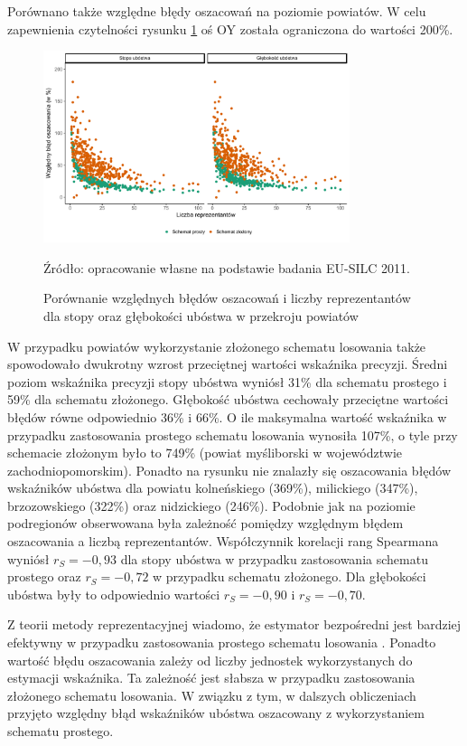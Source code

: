 Porównano także względne błędy oszacowań na poziomie powiatów. W celu zapewnienia czytelności rysunku \ref{fig:prec_ht_pow} oś OY została ograniczona do wartości 200\%.

\begin{figure}[htp]
\centering
\includegraphics[width=0.8\textwidth]{04_wykresy/precyzja_ht_pow-1.pdf}
\caption{Porównanie względnych błędów oszacowań i liczby reprezentantów dla stopy oraz głębokości ubóstwa w przekroju powiatów}
\small{Źródło: opracowanie własne na podstawie badania EU-SILC 2011.}
\label{fig:prec_ht_pow}
\end{figure}

W przypadku powiatów wykorzystanie złożonego schematu losowania także spowodowało dwukrotny wzrost przeciętnej wartości wskaźnika precyzji. Średni poziom wskaźnika precyzji stopy ubóstwa wyniósł 31\% dla schematu prostego i 59\% dla schematu złożonego. Głębokość ubóstwa cechowały przeciętne wartości błędów równe odpowiednio 36\% i 66\%. O ile maksymalna wartość wskaźnika w przypadku zastosowania prostego schematu losowania wynosiła 107\%, o tyle przy schemacie złożonym było to 749\% (powiat myśliborski w województwie zachodniopomorskim). Ponadto na rysunku nie znalazły się oszacowania błędów wskaźników ubóstwa dla powiatu kolneńskiego (369\%), milickiego (347\%), brzozowskiego (322\%) oraz nidzickiego (246\%). Podobnie jak na poziomie podregionów obserwowana była zależność pomiędzy względnym błędem oszacowania a liczbą reprezentantów. Współczynnik korelacji rang Spearmana wyniósł $r_S=-0,93$ dla stopy ubóstwa w przypadku zastosowania schematu prostego oraz $r_S=-0,72$ w przypadku schematu złożonego. Dla głębokości ubóstwa były to odpowiednio wartości $r_S=-0,90$ i $r_S=-0,70$.

Z teorii metody reprezentacyjnej wiadomo, że estymator bezpośredni jest bardziej efektywny w przypadku zastosowania prostego schematu losowania \citep{bracha1996}. Ponadto wartość błędu oszacowania zależy od liczby jednostek wykorzystanych do estymacji wskaźnika. Ta zależność jest słabsza w przypadku zastosowania złożonego schematu losowania. W związku z tym, w dalszych obliczeniach przyjęto względny błąd wskaźników ubóstwa oszacowany z wykorzystaniem schematu prostego.

